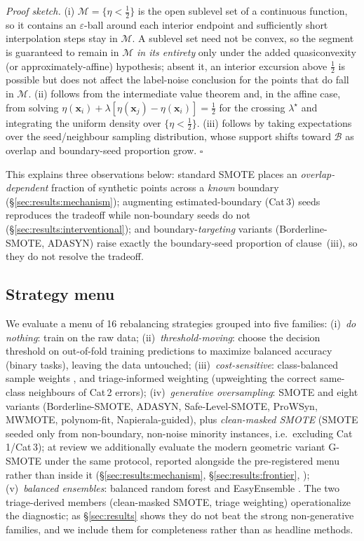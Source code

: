 \noindent\emph{Proof sketch.} (i) $\mathcal{M}=\{\eta<\tfrac12\}$ is the open
sublevel set of a continuous function, so it contains an $\varepsilon$-ball around
each interior endpoint and sufficiently short interpolation steps stay in
$\mathcal{M}$. A sublevel set need not be convex, so the segment is guaranteed to
remain in $\mathcal{M}$ \emph{in its entirety} only under the added quasiconvexity
(or approximately-affine) hypothesis; absent it, an interior excursion above
$\tfrac12$ is possible but does not affect the label-noise conclusion for the
points that do fall in $\mathcal{M}$. (ii) follows from the
intermediate value theorem and, in the affine case, from solving
$\eta(\mathbf{x}_i)+\lambda[\eta(\mathbf{x}_j)-\eta(\mathbf{x}_i)]=\tfrac12$ for the
crossing $\lambda^\star$ and integrating the uniform density over
$\{\eta<\tfrac12\}$. (iii) follows by taking expectations over the seed/neighbour
sampling distribution, whose support shifts toward $\mathcal{B}$ as overlap and
boundary-seed proportion grow. \hfill$\square$

This explains three observations below: standard SMOTE places an
\emph{overlap-dependent} fraction of synthetic points across a \emph{known}
boundary (\S\ref{sec:results:mechanism}); augmenting estimated-boundary (Cat\,3)
seeds reproduces the tradeoff while non-boundary seeds do not
(\S\ref{sec:results:interventional}); and boundary-\emph{targeting} variants
(Borderline-SMOTE, ADASYN) raise exactly the boundary-seed proportion of
clause~(iii), so they do not resolve the tradeoff.

\subsection{Strategy menu}\label{sec:method:menu}

We evaluate a menu of 16 rebalancing strategies grouped into five families:
(i)~\emph{do nothing}: train on the raw data;
(ii)~\emph{threshold-moving}: choose the decision threshold on out-of-fold
training predictions to maximize balanced accuracy (binary tasks), leaving the
data untouched;
(iii)~\emph{cost-sensitive}: class-balanced sample weights
\cite{elkan2001foundations}, and triage-informed weighting (upweighting the
correct same-class neighbours of Cat\,2 errors);
(iv)~\emph{generative oversampling}: SMOTE \cite{chawla2002smote} and eight
variants (Borderline-SMOTE, ADASYN, Safe-Level-SMOTE, ProWSyn, MWMOTE,
polynom-fit, Napierala-guided), plus \emph{clean-masked SMOTE} (SMOTE seeded only
from non-boundary, non-noise minority instances, i.e.\ excluding Cat\,1/Cat\,3);
at review we additionally evaluate the modern geometric variant G-SMOTE
\cite{douzas2019geometric} under the same protocol, reported alongside the
pre-registered menu rather than inside it
(\S\ref{sec:results:mechanism}, \S\ref{sec:results:frontier}, );
(v)~\emph{balanced ensembles}: balanced random forest \cite{chen2004using} and
EasyEnsemble \cite{liu2009exploratory}.
The two triage-derived members (clean-masked SMOTE, triage weighting)
operationalize the diagnostic; as \S\ref{sec:results} shows they do not beat
the strong non-generative families, and we include them for completeness rather
than as headline methods.

